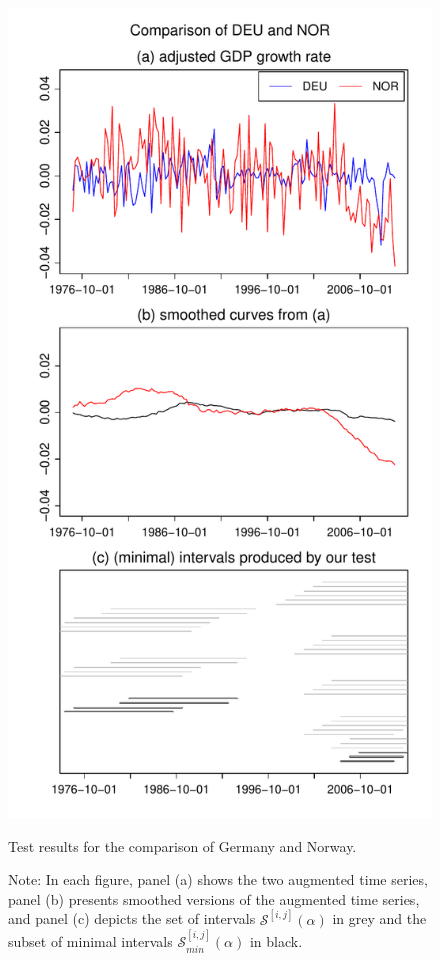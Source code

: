 \documentclass[a4paper,12pt]{article}
\begin{document}
\begin{figure}[p!]
\begin{minipage}[t]{0.49\textwidth}
\includegraphics[width=\textwidth]{Plots/DEU_vs_NOR}
\caption{Test results for the comparison of Germany and Norway.}\label{fig:Germany:Norway}
\end{minipage}
\caption*{Note: In each figure, panel (a) shows the two augmented time series, panel (b) presents smoothed versions of the augmented time series, and panel (c) depicts the set of intervals $\mathcal{S}^{[i,j]}(\alpha)$ in grey and the subset of minimal intervals $\mathcal{S}^{[i,j]}_{min}(\alpha)$ in black.}
\end{figure}
\end{document}
